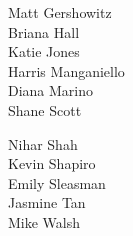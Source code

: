 \documentclass{article}[10pt]
\begin{document}
\begin{center}
{\begin{multicols*}{3}
\begin{center}
\begin{small}
{Matt Gershowitz}\\
{Briana Hall}\\
{Katie Jones}\\
{Harris Manganiello}\\
{Diana Marino}\\
{Shane Scott}\vfill\null
\columnbreak

{Nihar Shah}\\
{Kevin Shapiro}\\
{Emily Sleasman}\\
{Jasmine Tan}\\
{Mike Walsh}
                    \end{small}
                \end{center}
            \end{multicols*}
        }
    \end{center}

    \pagebreak

\end{document}
